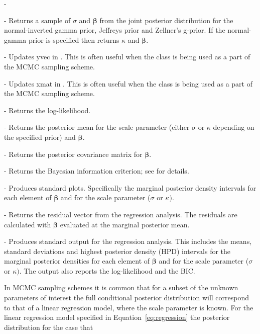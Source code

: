 -\documentclass[article]{jss}
\begin{document}
\begin{description}
\item {} - Returns a sample of $\sigma$ and $\bm{\beta}$
  from the joint posterior distribution for the normal-inverted gamma
  prior, Jeffreys prior and Zellner's g-prior. If the normal-gamma
  prior is specified then  returns $\kappa$ and
  $\bm{\beta}.$
\item {} - Updates yvec in
  . This is often useful when the class is being
  used as a part of the MCMC sampling scheme.
\item {} - Updates xmat in
  . This is often useful when the class is being
  used as a part of the MCMC sampling scheme.
\item {} - Returns the log-likelihood.
\item {} - Returns the posterior mean for the
  scale parameter (either $\sigma$ or $\kappa$ depending on the
  specified prior) and $\bm{\beta}.$
\item {} - Returns the posterior
  covariance matrix for $\bm{\beta}$.
\item {} - Returns the Bayesian information criterion; see
  \cite{KassRaftery1995} for details.
\item {} - Produces standard plots.
  Specifically the marginal posterior density intervals for each
  element of $\bm{\beta}$ and for the scale parameter ($\sigma$ or
  $\kappa)$.
\item {} - Returns the residual vector from the
  regression analysis.  The residuals are calculated with $\bm{\beta}$
  evaluated at the marginal posterior mean.
\item {} - Produces standard output for the regression
  analysis.  This includes the means, standard deviations and highest
  posterior density (HPD) intervals for the marginal posterior
  densities for each element of $\bm{\beta}$ and for the scale
  parameter ($\sigma$ or $\kappa)$. The output also reports the
  log-likelihood and the BIC.
\end{description}
In MCMC sampling schemes it is common that for a subset of the unknown
parameters of interest the full conditional posterior distribution
will correspond to that of a linear regression model, where the scale
parameter is known. For the linear regression model specified in
Equation~\ref{eq:regression} the posterior distribution for the case that
\end{document}
